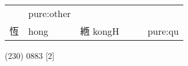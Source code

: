 \documentclass[14pt,a4paper]{scrartcl}
\begin{document}
\begin{longtable}[c]{@{}llllll@{}}
\begin{minipage}[t]{0.14\columnwidth}
\strut\end{minipage} &
\begin{minipage}[t]{0.14\columnwidth}\raggedright\strut
pure:other
\strut\end{minipage}\tabularnewline
\begin{minipage}[t]{0.14\columnwidth}\raggedright\strut
恆
\strut\end{minipage} &
\begin{minipage}[t]{0.14\columnwidth}\raggedright\strut
hong
\strut\end{minipage} &
\begin{minipage}[t]{0.14\columnwidth}\raggedright\strut
緪 kongH
\strut\end{minipage} &
\begin{minipage}[t]{0.14\columnwidth}\raggedright\strut
\strut\end{minipage} &
\begin{minipage}[t]{0.14\columnwidth}\raggedright\strut
\strut\end{minipage} &
\begin{minipage}[t]{0.14\columnwidth}\raggedright\strut
pure:qu
\strut\end{minipage}\tabularnewline
\bottomrule
\end{longtable}

(230) 0883 {[}2{]}
\end{document}

